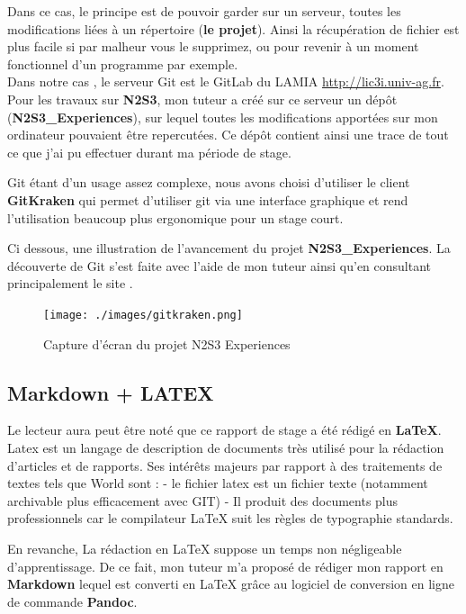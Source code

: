 Dans ce cas, le principe est de pouvoir garder sur un serveur, toutes
les modifications liées à un répertoire (\textbf{le projet}). Ainsi la
récupération de fichier est plus facile si par malheur vous le
supprimez, ou pour revenir à un moment fonctionnel d'un programme par
exemple.\\
Dans notre cas , le serveur Git est le GitLab du LAMIA
\url{http://lic3i.univ-ag.fr}. Pour les travaux sur \textbf{N2S3}, mon
tuteur a créé sur ce serveur un dépôt (\textbf{N2S3\_Experiences}), sur
lequel toutes les modifications apportées sur mon ordinateur pouvaient
être repercutées. Ce dépôt contient ainsi une trace de tout ce que j'ai
pu effectuer durant ma période de stage.

Git étant d'un usage assez complexe, nous avons choisi d'utiliser le
client \textbf{GitKraken} qui permet d'utiliser git via une interface
graphique et rend l'utilisation beaucoup plus ergonomique pour un stage
court.

Ci dessous, une illustration de l'avancement du projet
\textbf{N2S3\_Experiences}. La découverte de Git s'est faite avec l'aide
de mon tuteur ainsi qu'en consultant principalement le site \cite{git}.

\begin{figure}[h!]
\label{fig:gitkrakenUsage}
\centering
\texttt{[image: ./images/gitkraken.png]}
\caption{Capture d'écran du projet N2S3 Experiences}
\end{figure}

\hypertarget{markdown-latex}{%
\subsection{Markdown + LATEX}\label{markdown-latex}}

Le lecteur aura peut être noté que ce rapport de stage a été rédigé en
\textbf{LaTeX}. Latex est un langage de description de documents très
utilisé pour la rédaction d'articles et de rapports. Ses intérêts
majeurs par rapport à des traitements de textes tels que World sont : -
le fichier latex est un fichier texte (notamment archivable plus
efficacement avec GIT) - Il produit des documents plus professionnels
car le compilateur LaTeX suit les règles de typographie standards.

En revanche, La rédaction en LaTeX suppose un temps non négligeable
d'apprentissage. De ce fait, mon tuteur m'a proposé de rédiger mon
rapport en \textbf{Markdown} lequel est converti en LaTeX grâce au
logiciel de conversion en ligne de commande \textbf{Pandoc}.

